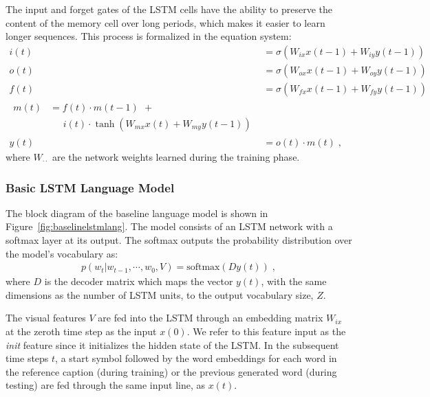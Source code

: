 The input and forget gates of the LSTM cells have the ability to preserve the
content of the memory cell over long periods, which makes it easier to learn
longer sequences.
This process is formalized in the equation system:
\begin{align}
  \label{eqn:lstmstrt}
  i(t) &= \sigma(W_{ix}x(t-1) + W_{iy}y(t-1))\\
  o(t) &= \sigma(W_{ox}x(t-1) + W_{oy}y(t-1))\\
  f(t) &= \sigma(W_{fx}x(t-1) + W_{fy}y(t-1))\\
  \label{eqn:lstmend}
  \begin{split}
    m(t) &= f(t)\cdot m(t-1) \:\, + \\
    &\; \; \; \; \; i(t)\cdot \tanh(W_{mx}x(t)+W_{my}y(t-1))
  \end{split}\\
  y(t) &= o(t) \cdot m(t) \;,
\end{align}
where $W_{\cdot\cdot}$ are the network weights learned during the
training phase.


\subsubsection{Basic LSTM Language Model}
\label{subsec:basiclstmodel}

The block diagram of the baseline language model is shown in
Figure~\ref{fig:baselinelstmlang}.
The model consists of an LSTM network with a softmax layer at its output.
The softmax outputs the probability distribution over the model's vocabulary as:
\begin{align}
p(w_t | w_{t-1},\cdots,w_0, V) = \text{softmax}(D y(t)) \;,
\end{align}
\noindent where $D$ is the decoder matrix which maps the vector $y(t)$, with
the same dimensions as the number of LSTM units, to the output vocabulary size,
$Z$.

The visual features $V$ are fed into the LSTM through an embedding matrix
$W_{ix}$ at the zeroth time step as the input $x(0)$.
We refer to this feature input as the \emph{init} feature since it initializes
the hidden state of the LSTM.
In the subsequent time steps $t$, a start symbol followed by the word embeddings
for each word in the reference caption (during training) or the previous
generated word (during testing) are fed through the same input line, as $x(t)$.

